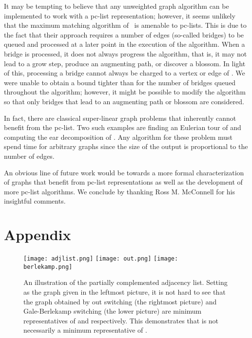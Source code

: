 \documentclass{llncs}
\begin{document}
It may be tempting to believe that any unweighted graph algorithm can be implemented to work with a pc-list representation; however, it seems unlikely that the maximum matching algorithm of~\cite{MicaliV80} is amenable to pc-lists.  This is due to the fact that their approach requires a number of edges (so-called bridges) to be queued and processed at a later point in the execution of the algorithm.  When a bridge is processed, it does not always progress the algorithm, that is, it may not lead to a grow step, produce an augmenting path, or discover a blossom.  In light of this, processing a bridge cannot always be charged to a vertex or edge of .  We were unable to obtain a bound tighter than  for the number of bridges queued throughout the algorithm; however, it might be possible to modify the algorithm so that only bridges that lead to an augmenting path or blossom are considered.

In fact, there are classical super-linear graph problems that inherently cannot benefit from the pc-list.  Two such examples are finding an Eulerian tour of  and computing the ear decomposition of .  Any algorithm for these problem must spend  time for arbitrary graphs since the size of the output is proportional to the number of edges.

An obvious line of future work would be towards a more formal characterization of graphs that benefit from pc-list representations as well as the development of more pc-list algorithms.  We conclude by thanking Ross M. McConnell for his insightful comments.








\section{Appendix}

\begin{figure}[htp]\label{fig:pclist}

\texttt{[image: adjlist.png]} \texttt{[image: out.png]}
\centering
\texttt{[image: berlekamp.png]}
\caption{An illustration of the partially complemented adjacency list.  Setting  as the graph given in the leftmost picture, it is not hard to see that the graph obtained by out switching (the rightmost picture) and Gale-Berlekamp switching (the lower picture) are minimum representatives of  and  respectively.  This demonstrates that  is not necessarily a minimum representative of .}
\end{figure}
\end{document}
